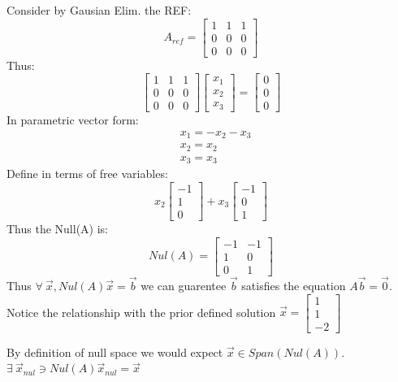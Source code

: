 \documentclass[11pt]{article}
\theoremstyle{plain}
\begin{document}
Consider by Gausian Elim. the REF:
\[
	A_{ref} = \begin{bmatrix}
		1 & 1 & 1 \\
		0 & 0 & 0 \\
		0 & 0 & 0
	\end{bmatrix}
\]
Thus:
\[
	\begin{bmatrix}
		1 & 1 & 1 \\
		0 & 0 & 0 \\
		0 & 0 & 0
	\end{bmatrix}
	\begin{bmatrix}
		x_1 \\ x_2 \\ x_3
	\end{bmatrix}
	=
	\begin{bmatrix}
		0 \\ 0 \\ 0
	\end{bmatrix}
\]
In parametric vector form:
\[
	\begin{aligned}
		 & x_1 = -x_2 -x_3 \\
		 & x_2 = x_2       \\
		 & x_3 = x_3
	\end{aligned}
\]
Define in terms of free variables:
\[
	x_2\begin{bmatrix} -1 \\ 1 \\ 0 \end{bmatrix}+
	x_3\begin{bmatrix} -1 \\ 0 \\ 1 \end{bmatrix}
\]
Thus the Null(A) is:
\[
	Nul(A) =
	\begin{bmatrix}
		-1 & -1 \\
		1  & 0  \\
		0  & 1
	\end{bmatrix}
\]
Thus $\forall ~\vec{x}, Nul(A)\vec{x} = \vec{b}$ we can guarentee $\vec{b}$ satisfies the equation $A \vec{b} = \vec{0}$. \vspace{1.2em}
Notice the relationship with the prior defined solution
$\vec{x} =
	\begin{bmatrix}
		1 \\
		1 \\
		-2
	\end{bmatrix}
$ \\
\begin{center}
	By definition of null space we would expect $\vec{x} \in Span(Nul(A))$. \\
	$\exists ~\vec{x}_{nul} \ni Nul(A) \vec{x}_{nul} = \vec{x}$
\end{center}
\end{document}
